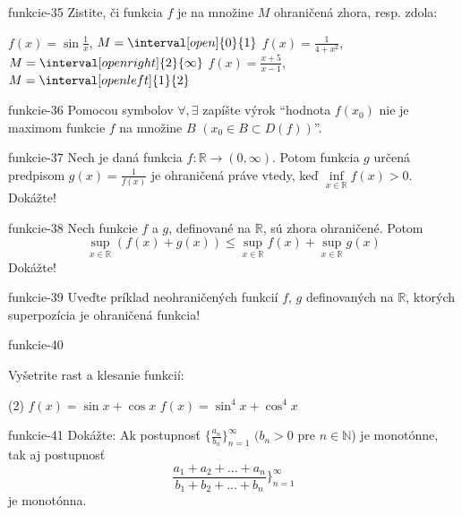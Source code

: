 \begin{defproblem}{funkcie-35}
Zistite, či funkcia $f$ je na množine $M$ ohraničená zhora, resp. zdola:
\begin{tasks}
  \task
      $f(x) = \sin\frac{1}{x}$,
      $M = \interval[open]{0}{1}$
  \task
    $f(x) = \frac{1}{4+x^2}$,
    $M = \interval[open right]{2}{\infty}$
  \task
    $f(x)=\frac{x+5}{x-1}$,
    $M = \interval[open left]{1}{2}$
\end{tasks}
\end{defproblem}

\begin{defproblem}{funkcie-36}
Pomocou symbolov $\forall,\exists$ zapíšte výrok \enquote{hodnota $f(x_0)$ nie je
maximom funkcie $f$ na množine $B$ $(x_0\in B\subset D(f))$}.
\end{defproblem}

\begin{defproblem}{funkcie-37}
Nech je daná funkcia $f:\mathbb{R}\rightarrow(0,\infty)$. Potom funkcia $g$
určená predpisom $g(x)=\frac{1}{f(x)}$ je ohraničená práve vtedy, keď
$\inf\limits_{x\in\mathbb{R}}f(x)>0$. Dokážte!
\end{defproblem}

\begin{defproblem}{funkcie-38}
Nech funkcie $f$ a $g$, definované na $\mathbb{R}$, sú zhora ohraničené. Potom
\[
  \sup_{x\in\mathbb{R}}(f(x)+g(x))
  \leq
  \sup_{x\in\mathbb{R}} f(x) + \sup_{x\in\mathbb{R}} g(x)
\]
Dokážte!
\end{defproblem}

\begin{defproblem}{funkcie-39}
Uveďte príklad neohraničených funkcií $f$, $g$ definovaných na $\mathbb{R}$,
ktorých superpozícia je ohraničená funkcia!
\end{defproblem}

\begin{defproblem}{funkcie-40}
\par
{}
Vyšetrite rast a klesanie funkcií:
\begin{tasks}(2)
  \task $f(x)=\sin x +\cos x$
  \task $f(x)=\sin^4 x +\cos^4 x$
\end{tasks}
\end{defproblem}

\begin{defproblem}{funkcie-41}
Dokážte: Ak postupnosť $\{\frac{a_n}{b_n}\}_{n=1}^\infty$ $(b_n>0$ pre
$n\in\mathbb{N}$) je monotónne, tak aj postupnosť
\[
  \frac{a_1+a_2+...+a_n}{b_1+b_2+...+b_n}\}_{n=1}^\infty
\]
je monotónna.
\end{defproblem}

